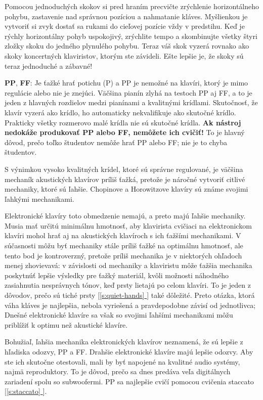 \documentclass[11pt,a4paper]{book}
\newcommand*{\fullref}[1]{\hyperref[{#1}]{\ref*{#1} \nameref*{#1}}} %
\newcommand*{\fullrefp}[1]{[\fullref{#1}]} %
\begin{document}
Pomocou jednoduchých skokov si pred hraním precvičte zrýchlenie horizontálneho pohybu, zastavenie nad správnou pozíciou a nahmatanie kláves. Myšlienkou je vytvoriť si zvyk dostať sa rukami do cieľovej pozície vždy v predstihu. Keď je rýchly horizontálny pohyb uspokojivý, zrýchlite tempo a skombinujte všetky štyri zložky skoku do jedného plynulého pohybu. Teraz váš skok vyzerá rovnako ako skoky koncertných klaviristov, ktorým ste závideli. Ešte lepšie je, že skoky sú teraz jednoduché a zábavné!

\textbf{PP}, \textbf{FF}: Je ťažké hrať potichu (P) a PP je nemožné na klavíri, ktorý je mimo regulácie alebo nie je znejúci. Väčšina pianín zlyhá na testoch PP aj FF, a to je jeden z hlavných rozdielov medzi pianínami a kvalitnými krídlami. Skutočnosť, že klavír vyzerá ako krídlo, ho automaticky nekvalifikuje ako skutočné krídlo. Prakticky všetky rozmerovo malé krídla nie sú skutočné krídla. \textbf{Ak nástroj nedokáže produkovať PP alebo FF, nemôžete ich cvičiť!} To je hlavný dôvod, prečo toľko študentov nemôže hrať PP alebo FF; nie je to chyba študentov.

S výnimkou vysoko kvalitných krídel, ktoré sú správne regulované, je väčšina mechaník  akustických klavírov príliš ťažká, pretože je náročné vytvoriť citlivé mechaniky, ktoré sú ľahšie. Chopinove a Horowitzove klavíry sú známe svojimi ľahkými mechanikami.

Elektronické klavíry toto obmedzenie nemajú, a preto majú ľahšie mechaniky. Musia mať určitú minimálnu hmotnosť, aby klavirista cvičiaci na elektronickom klavíri mohol hrať aj na akustických klavíroch s ich ťažšími mechanikami. V súčasnosti môžu byť mechaniky stále príliš ťažké na optimálnu hmotnosť, ale tento bod je kontroverzný, pretože príliš mechanika je v niektorých ohľadoch menej zhovievavá: v závislosti od mechaniky a klaviristu môže ťažšia mechanika poskytnúť lepšie výsledky pre ťažký materiál, kvôli možnosti náhodného zasiahnutia nesprávnych tónov, keď prsty lietajú po celom klavíri. To je jeden z dôvodov, prečo sú tiché prsty \fullrefp{s:quiet-hands} také dôležité. Preto otázka, ktorá váha kláves je najlepšia, nebola vyriešená a pravdepodobne závisí od jednotlivca; Dnešné elektronické klavíre sa však so svojimi ľahšími mechanikami môžu priblížiť k optimu než akustické klavíre.

Bohužiaľ, ľahšia mechanika elektronických klavírov neznamená, že sú lepšie z hľadiska odozvy, PP a FF. Drahšie elektronické klavíre majú lepšie odozvy. Aby ste ich skutočne otestovali, mali by byť napojené na kvalitné audio systémy, najmä reproduktory. To je dôvod, prečo sa dnes predáva veľa digitálnych zariadení spolu so subwoofermi. PP sa najlepšie cvičí pomocou cvičenia staccato \fullrefp{s:staccato}.
\end{document}
